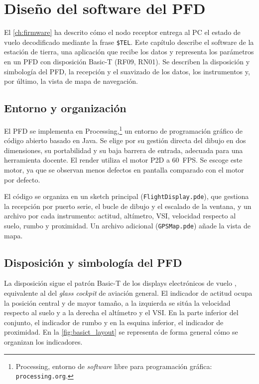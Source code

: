 
\chapter{Diseño del software del PFD}
\label{ch:software}

El \cref{ch:firmware} ha descrito cómo el nodo receptor entrega al PC el estado
de vuelo decodificado mediante la frase \texttt{\$TEL}. Este capítulo
describe el software de la estación de tierra, una aplicación que recibe los datos y representa los parámetros en un PFD con disposición Basic-T (RF09, RN01). Se describen la disposición y simbología
del PFD, la recepción y el suavizado de los datos, los instrumentos y, por
último, la vista de mapa de navegación.


\section{Entorno y organización}
\label{sec:sw_entorno}

El PFD se implementa en Processing,\footnote{Processing, entorno de
\textit{software} libre para programación gráfica: \texttt{processing.org}.} un
entorno de programación gráfico de código abierto basado en Java. Se elige por su gestión directa del dibujo en dos dimensiones,
su portabilidad y su baja barrera de entrada, adecuada para una herramienta
docente. El render utiliza el motor P2D a \SI{60}{FPS}. Se escoge este motor, ya que se observan menos defectos en pantalla comparado con el motor por defecto.

El código se organiza en un sketch principal (\texttt{FlightDisplay.pde}), que
gestiona la recepción por puerto serie, el bucle de dibujo y el escalado de la
ventana, y un archivo por cada instrumento: actitud, altímetro, VSI, velocidad
respecto al suelo, rumbo y proximidad. Un archivo adicional
(\texttt{GPSMap.pde}) añade la vista de mapa.


\section{Disposición y simbología del PFD}
\label{sec:sw_basict}

La disposición sigue el patrón Basic-T de los displays electrónicos de vuelo
\cite{ac25_11b}, equivalente al del \textit{glass cockpit} de aviación general.
El indicador de actitud ocupa la posición central y de mayor tamaño, a la
izquierda se sitúa la velocidad respecto al suelo y a la derecha el altímetro y
el VSI. En la parte inferior del conjunto, el indicador de rumbo y en la esquina inferior, el indicador
de proximidad. En la \cref{fig:basict_layout} se representa de forma general cómo se organizan los indicadores.


